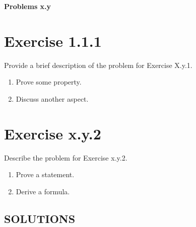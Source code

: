 \documentclass{exam}
\begin{document}
\begin{center}
    \textbf{\Large Problems x.y }
\end{center}

\section*{Exercise 1.1.1}
Provide a brief description of the problem for Exercise X.y.1.
\begin{enumerate}
    \item Prove some property.
    \item Discuss another aspect.
\end{enumerate}

\section*{Exercise x.y.2}
 Describe the problem for Exercise x.y.2.
\begin{enumerate}
    \item Prove a statement.
    \item Derive a formula.
\end{enumerate}


\newpage

\begin{center}    
    \section*{SOLUTIONS}
\end{center}
\end{document}
